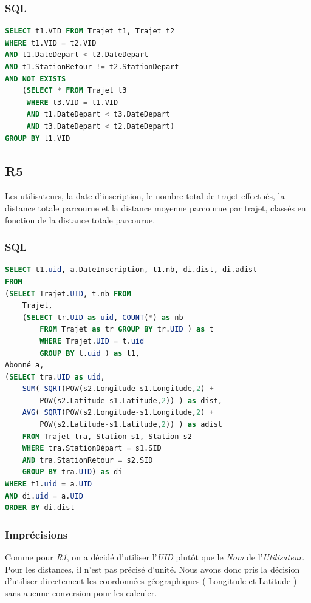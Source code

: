 \documentclass[a4paper, 12pt]{report}
\begin{document}
\subsubsection*{SQL}
\begin{lstlisting}[language=sql]
SELECT t1.VID FROM Trajet t1, Trajet t2
WHERE t1.VID = t2.VID
AND t1.DateDepart < t2.DateDepart
AND t1.StationRetour != t2.StationDepart
AND NOT EXISTS
	(SELECT * FROM Trajet t3
     WHERE t3.VID = t1.VID
     AND t1.DateDepart < t3.DateDepart
     AND t3.DateDepart < t2.DateDepart)
GROUP BY t1.VID
\end{lstlisting}


\subsection*{R5}

Les utilisateurs, la date d'inscription, le nombre total de trajet effectués, la distance totale parcourue et la distance moyenne parcourue par trajet, classés en fonction de la distance totale parcourue.

\subsubsection*{SQL}

\begin{lstlisting}[language=sql]
SELECT t1.uid, a.DateInscription, t1.nb, di.dist, di.adist 
FROM 
(SELECT Trajet.UID, t.nb FROM
	Trajet,
	(SELECT tr.UID as uid, COUNT(*) as nb 
		FROM Trajet as tr GROUP BY tr.UID ) as t
		WHERE Trajet.UID = t.uid
		GROUP BY t.uid ) as t1,
Abonné a,
(SELECT tra.UID as uid, 
	SUM( SQRT(POW(s2.Longitude-s1.Longitude,2) +
	 	POW(s2.Latitude-s1.Latitude,2)) ) as dist,
	AVG( SQRT(POW(s2.Longitude-s1.Longitude,2) + 
		POW(s2.Latitude-s1.Latitude,2)) ) as adist
	FROM Trajet tra, Station s1, Station s2
	WHERE tra.StationDépart = s1.SID
	AND tra.StationRetour = s2.SID
	GROUP BY tra.UID) as di
WHERE t1.uid = a.UID
AND di.uid = a.UID
ORDER BY di.dist
\end{lstlisting}

\subsubsection*{Imprécisions}

Comme pour \textit{R1}, on a décidé d'utiliser l'\textit{UID} plutôt que le \textit{Nom} de l'\textit{Utilisateur}.
Pour les distances, il n'est pas précisé d'unité. Nous avons donc pris la décision d'utiliser directement les coordonnées géographiques ( Longitude et Latitude ) sans aucune conversion pour les calculer.
\end{document}
